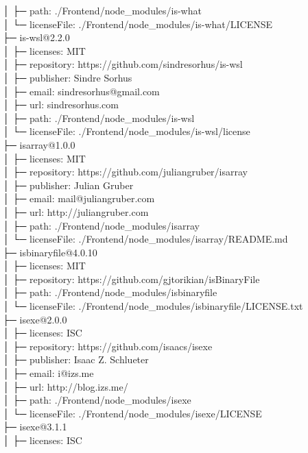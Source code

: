 │  ├─ path: ./Frontend/node\_modules/is-what\\
│  └─ licenseFile: ./Frontend/node\_modules/is-what/LICENSE\\
├─ is-wsl@2.2.0\\
│  ├─ licenses: MIT\\
│  ├─ repository: https://github.com/sindresorhus/is-wsl\\
│  ├─ publisher: Sindre Sorhus\\
│  ├─ email: sindresorhus@gmail.com\\
│  ├─ url: sindresorhus.com\\
│  ├─ path: ./Frontend/node\_modules/is-wsl\\
│  └─ licenseFile: ./Frontend/node\_modules/is-wsl/license\\
├─ isarray@1.0.0\\
│  ├─ licenses: MIT\\
│  ├─ repository: https://github.com/juliangruber/isarray\\
│  ├─ publisher: Julian Gruber\\
│  ├─ email: mail@juliangruber.com\\
│  ├─ url: http://juliangruber.com\\
│  ├─ path: ./Frontend/node\_modules/isarray\\
│  └─ licenseFile: ./Frontend/node\_modules/isarray/README.md\\
├─ isbinaryfile@4.0.10\\
│  ├─ licenses: MIT\\
│  ├─ repository: https://github.com/gjtorikian/isBinaryFile\\
│  ├─ path: ./Frontend/node\_modules/isbinaryfile\\
│  └─ licenseFile: ./Frontend/node\_modules/isbinaryfile/LICENSE.txt\\
├─ isexe@2.0.0\\
│  ├─ licenses: ISC\\
│  ├─ repository: https://github.com/isaacs/isexe\\
│  ├─ publisher: Isaac Z. Schlueter\\
│  ├─ email: i@izs.me\\
│  ├─ url: http://blog.izs.me/\\
│  ├─ path: ./Frontend/node\_modules/isexe\\
│  └─ licenseFile: ./Frontend/node\_modules/isexe/LICENSE\\
├─ isexe@3.1.1\\
│  ├─ licenses: ISC\\
